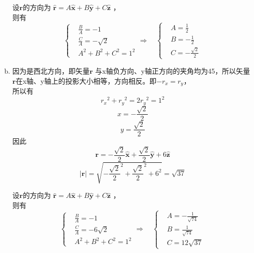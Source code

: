 \begin{enumerate}[(a)]
		设$\bm{r} $的方向为 $ \hat{\bm{r}} = A\hat{\bm{x}} + B\hat{\bm{y}} + C\hat{\bm{z}} $ ，\\
		则有
		\[
		 \left\{
		 \begin{aligned}
		&\frac{B}{A} = -1 \\
		&\frac{C}{A} =-\sqrt{2} \\
		&A^2+B^2+C^2 = 1^2
		 \end{aligned}
		 \right.
		 \Rightarrow \quad
		\left\{
		 \begin{aligned}
		&A = \frac{1}{2} \\
		&B = -\frac{1}{2} \\
		&C = -\frac{\sqrt{2}}{2}
		 \end{aligned}
		 \right.
		\]
		
		
	\item
	因为是西北方向，即矢量$\bm{r}$ 与x轴负方向、y轴正方向的夹角均为45\degree，所以矢量$\bm{r}$在x轴、y轴上的投影大小相等，方向相反。即$-r_x = r_y$，\\
所以有
		$$ {r_x}^2 + {r_y}^2 = 2 {r_y}^2 = 1^2 $$
		$$  x = -\frac{\sqrt{2}}{2} $$
		$$  y = \frac{\sqrt{2}}{2} $$
因此
		$$ \bm{r} =-\frac{\sqrt{2}}{2} \hat{\bm{x}} + \frac{\sqrt{2}}{2} \hat{\bm{y}} + 6 \hat{\bm{z}} $$
		$$ \lvert{\bm{r}}\rvert = \sqrt{{-\frac{\sqrt{2}}{2}}^2 +{\frac{\sqrt{2}}{2}}^2 + 6^2} = \sqrt{37} $$
		
		设$\bm{r} $的方向为 $ \hat{\bm{r}} = A\hat{\bm{x}} + B\hat{\bm{y}} + C\hat{\bm{z}} $ ，\\
		则有
		\[
		 \left\{
		 \begin{aligned}
		&\frac{B}{A} = -1 \\
		&\frac{C}{A} =-6 \sqrt{2} \\
		&A^2+B^2+C^2 = 1^2
		 \end{aligned}
		 \right.
		 \Rightarrow \quad
		\left\{
		 \begin{aligned}
		&A = -\frac{1}{\sqrt{74}} \\
		&B = \frac{1}{\sqrt{74}} \\
		&C = 12\sqrt{37}
		 \end{aligned}
		 \right.
		\]
\end{enumerate}
